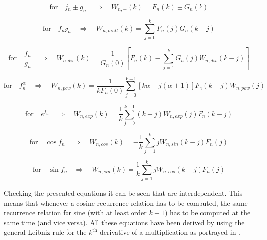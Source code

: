 \begin{equation} \label{eq:recRel1}
\text{for} \quad f_{n} \pm g_{n} \quad \Rightarrow \quad W_{n,\pm}\left(k\right)= F_{n}\left(k\right) \pm G_{n}\left(k\right)
\end{equation}

\begin{equation} \label{eq:recRel2}
\text{for} \quad f_{n}g_{n} \quad \Rightarrow \quad W_{n,mult}\left(k\right)=\displaystyle\sum_{j=0}^{k}F_{n}\left(j\right)G_{n}\left(k-j\right)
\end{equation}

\begin{equation} \label{eq:recRel3}
\text{for} \quad \dfrac{f_{n}}{g_{n}} \quad \Rightarrow \quad W_{n,div}\left(k\right)= \dfrac{1}{G_{n}\left(0\right)}\left[F_{n}\left(k\right)-\displaystyle\sum_{j=1}^{k}G_{n}\left(j\right)W_{n,div}\left(k-j\right) \right]
\end{equation}

\begin{equation} \label{eq:recRel4}
\text{for} \quad f_{n}^{\alpha} \quad \Rightarrow \quad W_{n,pow}\left(k\right)= \dfrac{1}{kF_{n}\left(0\right)} \displaystyle\sum_{j=0}^{k-1}\left[k\alpha-j\left(\alpha+1\right)\right] F_{n}\left(k-j\right)W_{n,pow}\left(j\right) 
\end{equation}

\begin{equation} \label{eq:recRel5}
\text{for} \quad e^{f_{n}} \quad \Rightarrow \quad W_{n,exp}\left(k\right)= \dfrac{1}{k}\displaystyle\sum_{j=0}^{k-1}\left(k-j\right)W_{n,exp}\left(j\right)F_{n}\left(k-j\right)
\end{equation}

\begin{equation} \label{eq:recRel6}
\text{for} \quad \cos f_{n} \quad \Rightarrow \quad W_{n,cos}\left(k\right)= -\dfrac{1}{k}\displaystyle\sum_{j=1}^{k}jW_{n,sin}\left(k-j\right)F_{n}\left(j\right)
\end{equation}

\begin{equation} \label{eq:recRel7}
\text{for} \quad \sin f_{n}  \quad \Rightarrow \quad W_{n,sin}\left(k\right)= \dfrac{1}{k}\displaystyle\sum_{j=1}^{k}jW_{n,cos}\left(k-j\right)F_{n}\left(j\right)
\end{equation}

\noindent
Checking the presented equations it can be seen that  are interdependent. This means that whenever a cosine recurrence relation has to be computed, the same recurrence relation for sine (with at least order $k-1$) has to be computed at the same time (and vice versa). All these equations have been derived by \cite{jorba2005software} using the general Leibniz rule for the $k^{\text{th}}$ derivative of a multiplication as portrayed in .

